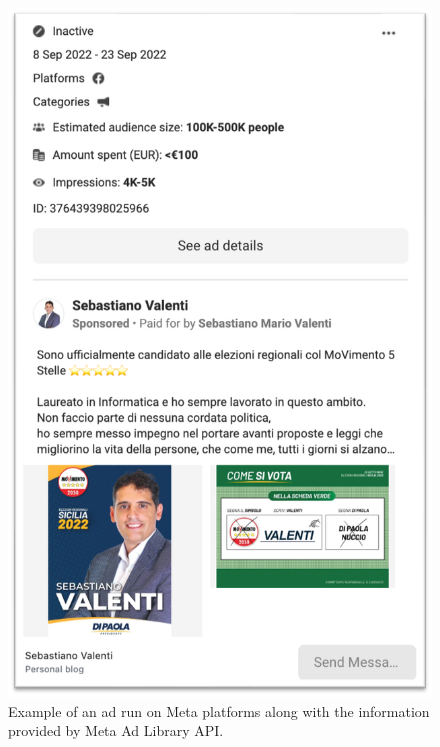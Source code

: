 \documentclass[letterpaper]{article} %
\begin{document}
\begin{figure}[!t]
    \centering
    \includegraphics[width=.7\linewidth]{ad_example.png}
    \caption{Example of an ad run on Meta platforms along with the information provided by Meta Ad Library API.}
    \label{fig:ad-meta}
\end{figure}
\end{document}
